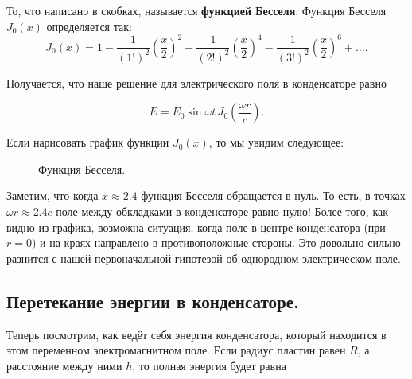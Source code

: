 \documentclass[12pt,a4paper]{article}
\numberwithin{equation}{section}
\numberwithin{equation}{section}
\begin{document}
То, что написано в скобках, называется \textbf{функцией
  Бесселя}. Функция Бесселя $J_0(x)$ определяется так: 
\begin{equation}
  \label{eq:def_bessel}
  J_0 (x) = 1 - \frac{1}{(1!)^2} \left(\frac{x}{2} \right)^2 +
  \frac{1}{(2!)^2} \left(\frac{x}{2} \right)^4 -  \frac{1}{(3!)^2}
  \left(\frac{x}{2} \right)^6 + \ldots.
\end{equation}

Получается, что наше решение для электрического поля в конденсаторе
равно 

\begin{equation}
  \label{eq:sol_conden}
  E = E_0 \sin \omega t\,  J_0 \left( \frac{\omega r}{c} \right). 
\end{equation}

Если нарисовать график функции $J_0 (x)$, то мы увидим следующее: 

\begin{figure}[ht]
  \centering
  \caption{Функция Бесселя.}
  \label{fig:bessel}
\end{figure}


Заметим, что когда $x \approx 2.4$ функция Бесселя обращается в
нуль. То есть, в точках $\omega r \approx 2.4 c$ поле между обкладками
в конденсаторе равно нулю! Более того, как видно из графика,
возможна ситуация, когда поле в центре конденсатора (при $r=0$) и на
краях направлено в противоположные стороны. Это довольно сильно
разнится с нашей первоначальной гипотезой об однородном электрическом
поле. 

\subsection{Перетекание энергии в конденсаторе. }
\label{sec:energy_capacitor}

Теперь посмотрим, как ведёт себя энергия конденсатора, который
находится в этом переменном электромагнитном поле. Если радиус пластин
равен $R$, а расстояние между ними $h$, то полная энергия будет равна
\end{document}
